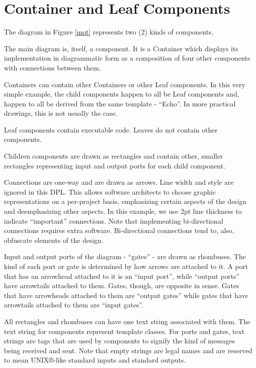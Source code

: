 \documentclass[10pt,anonymous,review]{acmart}
\begin{document}
\section{Container and Leaf Components} \label{containerleaf}
The diagram in Figure \ref{mot} represents two (2) kinds of components.

The main diagram is, itself, a component. It is a Container which displays its implementation in diagrammatic form as a composition of four other components with connections between them.

Containers can contain other Containers or other Leaf components. In this very simple example, the child components happen to all be Leaf components and, happen to all be derived from the same template - “Echo”. In more practical drawings, this is not usually the case.

Leaf components contain executable code. Leaves do not contain other components.

Children components are drawn as rectangles and contain other, smaller rectangles representing input and output ports for each child component.

Connections are one-way and are drawn as arrows. Line width and style are ignored in this DPL. This allows software architects to choose graphic representations on a per-project basis, emphasizing certain aspects of the design and deemphasizing other aspects. In this example, we use 2pt line thickness to indicate “important” connections. Note that implementing bi-directional connections requires extra software. Bi-directional connections tend to,
also, obfuscate elements of the design.

Input and output ports of the diagram - “gates” - are drawn as rhombuses. 
The kind of each port or gate is determined by how arrows are attached to it. A port that has an arrowhead attached to it is an “input port”, while “output ports” have arrowtails attached to them. Gates, though, are opposite in sense. Gates that have arrowheads attached to them are “output gates” while gates that have arrowtails attached to them are “input gates”.

All rectangles and rhombuses can have one text string associated with them. The text string for components represent template classes. For ports and gates, text strings are tags that are used by components to signify the kind of messages being received and sent. Note that empty strings are legal names and are reserved to mean UNIX®-like standard inputs and standard outputs.
\end{document}
